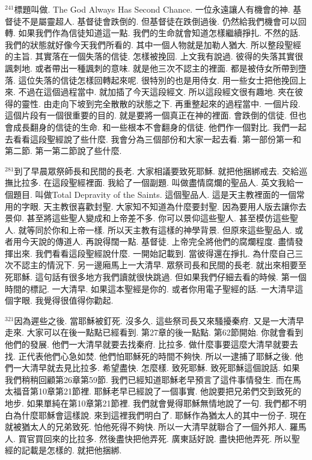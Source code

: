\documentclass{book}
\begin{document}
$^{241}$標題叫做.
The God Always Has Second Chance.
一位永遠讓人有機會的神.
基督徒不是屬靈超人.
基督徒會跌倒的.
但基督徒在跌倒過後.
仍然給我們機會可以回轉.
如果我們作為信徒知道這一點.
我們的生命就會知道怎樣繼續掙扎.
不然的話.
我們的狀態就好像今天我們所看的.
其中一個人物就是加勒人猶大.
所以整段聖經的主旨.
其實落在一個失落的信徒.
怎樣被挽回.
上文我有說過.
彼得的失落其實很諷刺地.
或者帶出一種諷刺的意味.
就是他三次不認主的裡面.
都是被侍女所帶到墮落.
這位失落的信徒怎樣回轉起來呢.
很特別的也是用侍女.
用一些女士把他挽回上來.
不過在這個過程當中.
就加插了今天這段經文.
所以這段經文很有趣地.
夾在彼得的靈性.
由走向下坡到完全散散的狀態之下.
再重整起來的過程當中.
一個片段.
這個片段有一個很重要的目的.
就是要將一個真正在神的裡面.
會跌倒的信徒.
但也會成長翻身的信徒的生命.
和一些根本不會翻身的信徒.
他們作一個對比.
我們一起去看看這段聖經說了些什麼.
我會分為三個部份和大家一起去看.
第一部份第一和第二節.
第一第二節說了些什麼.

$^{281}$到了早晨眾祭師長和民間的長老.
大家相議要致死耶穌.
就把他捆綁戒去.
交給巡撫比拉多.
在這段聖經裡面.
我給了一個副題.
叫做盡情腐爛的聖品人.
英文我給一個題目.
叫做Total Depravity of the Saints.
這個聖品人.
這是天主教裡面的一個常用的字眼.
天主教很喜歡封聖.
大家知不知道為什麼要封聖.
因為要用人版去讓你去景仰.
甚至將這些聖人變成和上帝差不多.
你可以景仰這些聖人.
甚至模仿這些聖人.
就等同於你和上帝一樣.
所以天主教有這樣的神學背景.
但原來這些聖品人.
或者用今天說的傳道人.
再說得闊一點.
基督徒.
上帝完全將他們的腐爛程度.
盡情發揮出來.
我們看看這段聖經說什麼.
一開始記載到.
當彼得還在掙扎.
為什麼自己三次不認主的情況下.
另一邊廂馬上一大清早.
眾祭司長和民間的長老.
就出來相要至死耶穌.
這句話有很多地方我們讀就很快跳過.
但如果我們仔細去看的時候.
第一個時間的標記.
一大清早.
如果這本聖經是你的.
或者你用電子聖經的話.
一大清早這個字眼.
我覺得很值得你勸起.

$^{321}$因為遲些之後.
當耶穌被釘死.
沒多久.
這些祭司長又來騷擾秦府.
又是一大清早走來.
大家可以在後一點點已經看到.
第27章的後一點點.
第62節開始.
你就會看到他們的發展.
他們一大清早就要去找秦府.
比拉多.
做什麼事要這麼大清早就要去找.
正代表他們心急如焚.
他們怕耶穌死的時間不夠快.
所以一逮捕了耶穌之後.
他們一大清早就去見比拉多.
希望盡快.
怎麼樣.
致死耶穌.
致死耶穌這個說話.
如果我們稍稍回顧第26章第59節.
我們已經知道耶穌老早預言了這件事情發生.
而在馬太福音第10章第21節裡.
耶穌老早已經說了一個事實.
他說要把兄弟們交到致死的地步.
如果單純在第10章第21節裡.
我們就會覺得耶穌無情地說了一句.
我們都不明白為什麼耶穌會這樣說.
來到這裡我們明白了.
耶穌作為猶太人的其中一份子.
現在就被猶太人的兄弟致死.
怕他死得不夠快.
所以一大清早就聯合了一個外邦人.
羅馬人.
買官買回來的比拉多.
然後盡快把他弄死.
廣東話好說.
盡快把他弄死.
所以聖經的記載是怎樣的.
就把他捆綁.
\end{document}
